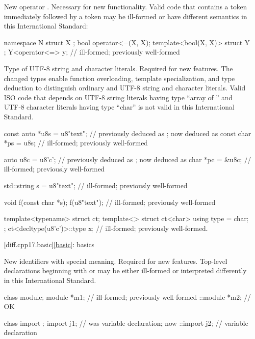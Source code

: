\change
New operator \tcode{<=>}.
\rationale
Necessary for new functionality.
\effect
Valid \CppXVII{} code that contains a \tcode{<=} token
immediately followed by a \tcode{>} token
may be ill-formed or have different semantics in this International Standard:
\begin{codeblock}
namespace N {
  struct X {};
  bool operator<=(X, X);
  template<bool(X, X)> struct Y {};
  Y<operator<=> y;              // ill-formed; previously well-formed
}
\end{codeblock}

\change
Type of UTF-8 string and character literals.
\rationale
Required for new features.
The changed types enable function overloading, template specialization, and
type deduction to distinguish ordinary and UTF-8 string and character literals.
\effect
Valid ISO \CppXVII{} code that depends on
UTF-8 string literals having type ``array of '' and
UTF-8 character literals having type ``char''
is not valid in this International Standard.
\begin{codeblock}
const auto *u8s = u8"text";     //  previously deduced as ; now deduced as 
const char *ps = u8s;           // ill-formed; previously well-formed

auto u8c = u8'c';               //  previously deduced as ; now deduced as 
char *pc = &u8c;                // ill-formed; previously well-formed

std::string s = u8"text";       // ill-formed; previously well-formed

void f(const char *s);
f(u8"text");                    // ill-formed; previously well-formed

template<typename> struct ct;
template<> struct ct<char> {
  using type = char;
};
ct<decltype(u8'c')>::type x;    // ill-formed; previously well-formed.
\end{codeblock}

[diff.cpp17.basic]{\ref{basic}: basics}

\change
New identifiers with special meaning.
\rationale
Required for new features.
\effect
Top-level declarations beginning with
 or  may
be either ill-formed or interpreted differently
in this International Standard.
\begin{example}
\begin{codeblock}
class module;
module *m1;         // ill-formed; previously well-formed
::module *m2;       // OK

class import {};
import j1;          // was variable declaration; now 
::import j2;        // variable declaration
\end{codeblock}
\end{example}

